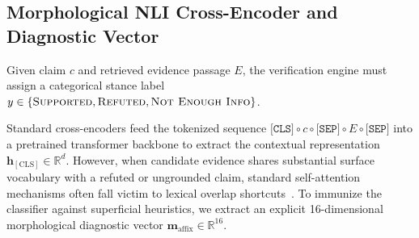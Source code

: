 \subsection{Morphological NLI Cross-Encoder and Diagnostic Vector}
\label{sec:morpho_nli}
Given claim $c$ and retrieved evidence passage $E$, the verification engine must assign a categorical stance label $y \in \{\textsc{Supported}, \textsc{Refuted}, \textsc{Not Enough Info}\}$.

Standard cross-encoders feed the tokenized sequence $\texttt{[CLS]} \circ c \circ \texttt{[SEP]} \circ E \circ \texttt{[SEP]}$ into a pretrained transformer backbone to extract the contextual representation $\mathbf{h}_{[\text{CLS}]} \in \mathbb{R}^d$. However, when candidate evidence shares substantial surface vocabulary with a refuted or ungrounded claim, standard self-attention mechanisms often fall victim to lexical overlap shortcuts~\citep{schuster2019fever}. To immunize the classifier against superficial heuristics, we extract an explicit 16-dimensional morphological diagnostic vector $\mathbf{m}_{\text{affix}} \in \mathbb{R}^{16}$.

